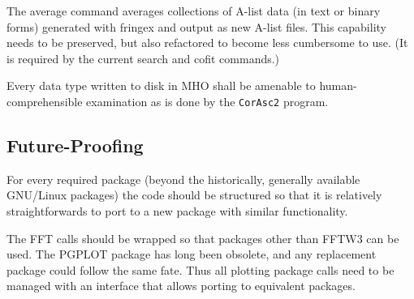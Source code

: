\begin{description}
 The \ac{average} command averages collections of \ac{A-list} data
    (in text or binary forms) generated with \ac{fringex} and output as
    new \ac{A-list} files.  This capability needs to be preserved, but
    also refactored to become less cumbersome to use.  (It is required
    by the current \ac{search} and \ac{cofit} commands.)

 Every data type written to disk in \ac{MHO} shall be 
    amenable to human-comprehensible examination as is done by the
    \texttt{\ac{CorAsc2}} program.

\end{description}

\subsection{Future-Proofing}
\label{sec:future}

For every required package (beyond the historically, generally
available \ac{GNU/Linux} packages) the code should be structured so
that it is relatively straightforwards to port to a new package with
similar functionality.

\begin{description}
 The \ac{FFT} calls should be wrapped so that packages other than
    \ac{FFTW3} can be used.
 The \ac{PGPLOT} package has long been obsolete, and any replacement
    package could follow the same fate.  Thus all plotting package calls
    need to be managed with an interface that allows porting to equivalent
    packages.
\end{description}

%
%
